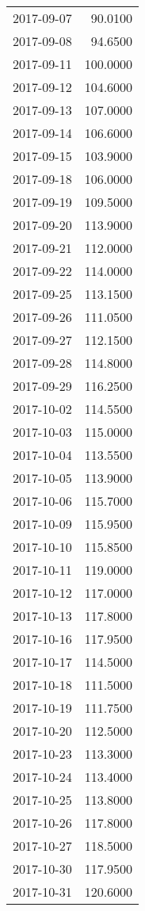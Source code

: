 \begin{tabular}{lr}
2017-09-07 &     90.0100 \\
2017-09-08 &     94.6500 \\
2017-09-11 &    100.0000 \\
2017-09-12 &    104.6000 \\
2017-09-13 &    107.0000 \\
2017-09-14 &    106.6000 \\
2017-09-15 &    103.9000 \\
2017-09-18 &    106.0000 \\
2017-09-19 &    109.5000 \\
2017-09-20 &    113.9000 \\
2017-09-21 &    112.0000 \\
2017-09-22 &    114.0000 \\
2017-09-25 &    113.1500 \\
2017-09-26 &    111.0500 \\
2017-09-27 &    112.1500 \\
2017-09-28 &    114.8000 \\
2017-09-29 &    116.2500 \\
2017-10-02 &    114.5500 \\
2017-10-03 &    115.0000 \\
2017-10-04 &    113.5500 \\
2017-10-05 &    113.9000 \\
2017-10-06 &    115.7000 \\
2017-10-09 &    115.9500 \\
2017-10-10 &    115.8500 \\
2017-10-11 &    119.0000 \\
2017-10-12 &    117.0000 \\
2017-10-13 &    117.8000 \\
2017-10-16 &    117.9500 \\
2017-10-17 &    114.5000 \\
2017-10-18 &    111.5000 \\
2017-10-19 &    111.7500 \\
2017-10-20 &    112.5000 \\
2017-10-23 &    113.3000 \\
2017-10-24 &    113.4000 \\
2017-10-25 &    113.8000 \\
2017-10-26 &    117.8000 \\
2017-10-27 &    118.5000 \\
2017-10-30 &    117.9500 \\
2017-10-31 &    120.6000 \\

\end{tabular}
